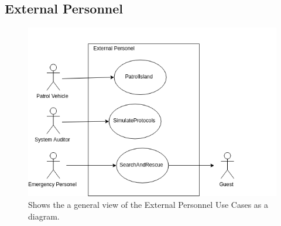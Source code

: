 \documentclass[12pt]{article}
\begin{document}
\subsection{External Personnel}
\begin{figure}[H]
    \centerline{\includegraphics[scale=.30]{Use_Cases__External.png}}
    \caption{Shows the a general view of the External Personnel Use Cases as a diagram.}
    \label{fig:usecaseguest}
\end{figure}
\end{document}

